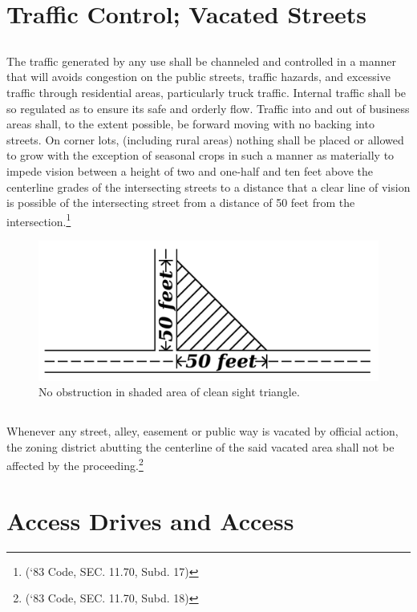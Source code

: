 \section{Traffic Control; Vacated Streets}
\subsection{}
The traffic generated by any use shall be channeled and controlled in a manner that will avoids congestion on the public streets, traffic hazards, and excessive traffic through residential areas, particularly truck traffic. Internal traffic shall be so regulated as to ensure its safe and orderly flow. Traffic into and out of business areas shall, to the extent possible, be forward moving with no backing into streets. On corner lots, (including rural areas) nothing shall be placed or allowed to grow with the exception of seasonal crops in such a manner as materially to impede vision between a height of two and one-half and ten feet above the centerline grades of the intersecting streets to a distance that a clear line of vision is possible of the intersecting street from a distance of 50 feet from the intersection.\footnote{(‘83 Code, SEC. 11.70, Subd. 17)}
\begin{figure}[h]
    \centering
    \includegraphics[width=\textwidth]{./images/citycode_fig1.jpg}
    \caption{No obstruction in shaded area of clean sight triangle.}
\end{figure}
\subsection{}
Whenever any street, alley, easement or public way is vacated by official action, the zoning district abutting the centerline of the said vacated area shall not be affected by the proceeding.\footnote{(‘83 Code, SEC. 11.70, Subd. 18)}

\section{Access Drives and Access}
